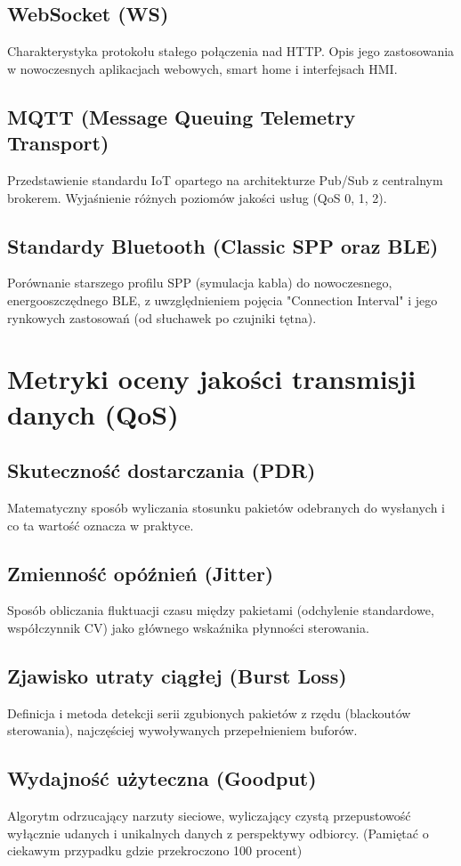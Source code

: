 \section{WebSocket (WS)}
Charakterystyka protokołu stałego połączenia nad HTTP.
Opis jego zastosowania w nowoczesnych aplikacjach webowych, smart home i interfejsach HMI.

\section{MQTT (Message Queuing Telemetry Transport)}
Przedstawienie standardu IoT opartego na architekturze Pub/Sub z centralnym brokerem.
Wyjaśnienie różnych poziomów jakości usług (QoS 0, 1, 2).

\section{Standardy Bluetooth (Classic SPP oraz BLE)}
Porównanie starszego profilu SPP (symulacja kabla) do nowoczesnego, energooszczędnego BLE, z uwzględnieniem pojęcia "Connection Interval" i jego rynkowych zastosowań (od słuchawek po czujniki tętna).

\chapter{Metryki oceny jakości transmisji danych (QoS)}

\section{Skuteczność dostarczania (PDR)}
Matematyczny sposób wyliczania stosunku pakietów odebranych do wysłanych i co ta wartość oznacza w praktyce.

\section{Zmienność opóźnień (Jitter)}
Sposób obliczania fluktuacji czasu między pakietami (odchylenie standardowe, współczynnik CV) jako głównego wskaźnika płynności sterowania.

\section{Zjawisko utraty ciągłej (Burst Loss)}
Definicja i metoda detekcji serii zgubionych pakietów z rzędu (blackoutów sterowania), najczęściej wywoływanych przepełnieniem buforów.

\section{Wydajność użyteczna (Goodput)}
Algorytm odrzucający narzuty sieciowe, wyliczający czystą przepustowość wyłącznie udanych i unikalnych danych z perspektywy odbiorcy.
(Pamiętać o ciekawym przypadku gdzie przekroczono 100 procent)

